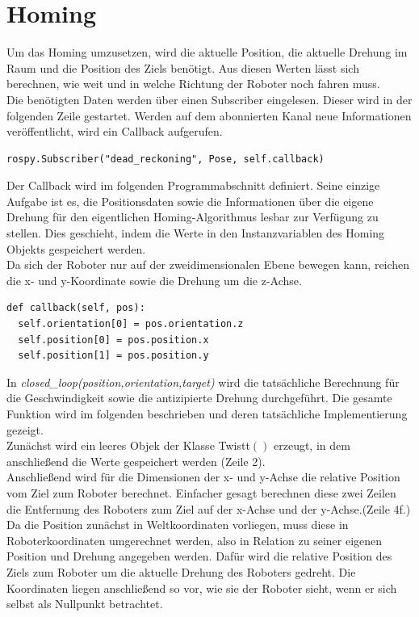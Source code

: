 \documentclass[12pt, a4paper]{report}
\begin{document}
\section{Homing}
Um das Homing umzusetzen, wird die aktuelle Position, die aktuelle Drehung im Raum und die Position des Ziels benötigt. Aus diesen Werten lässt sich berechnen, wie weit und in welche Richtung der Roboter noch fahren muss.\\
Die benötigten Daten werden über einen Subscriber eingelesen. Dieser wird in der folgenden Zeile gestartet. Werden auf dem abonnierten Kanal neue Informationen veröffentlicht, wird ein Callback aufgerufen. 
\begin{lstlisting}
rospy.Subscriber("dead_reckoning", Pose, self.callback)
\end{lstlisting}
Der Callback wird im folgenden Programmabschnitt definiert. Seine einzige Aufgabe ist es, die Positionsdaten sowie die Informationen über die eigene Drehung für den eigentlichen Homing-Algorithmus lesbar zur Verfügung zu stellen. Dies geschieht, indem die Werte in den Instanzvariablen des Homing Objekts gespeichert werden.\\
Da sich der Roboter nur auf der zweidimensionalen Ebene bewegen kann, reichen die x- und y-Koordinate sowie die Drehung um die z-Achse.
\begin{lstlisting}
def callback(self, pos):
  self.orientation[0] = pos.orientation.z
  self.position[0] = pos.position.x
  self.position[1] = pos.position.y
\end{lstlisting}
In \textit{closed\_loop(position,orientation,target)} wird die tatsächliche Berechnung für die Geschwindigkeit sowie die antizipierte Drehung durchgeführt. Die gesamte Funktion wird im folgenden beschrieben und deren tatsächliche Implementierung gezeigt.\\
Zunächst wird ein leeres Objek der Klasse Twistt$()$ erzeugt, in dem anschließend die Werte gespeichert werden (Zeile 2).\\
Anschließend wird für die Dimensionen der x- und y-Achse die relative Position vom Ziel zum Roboter berechnet. Einfacher gesagt berechnen diese zwei Zeilen die Entfernung des Roboters zum Ziel auf der x-Achse und der y-Achse.(Zeile 4f.)\\
Da die Position zunächst in Weltkoordinaten vorliegen, muss diese in Roboterkoordinaten umgerechnet werden, also in Relation zu seiner eigenen Position und Drehung angegeben werden. Dafür wird die relative Position des Ziels zum Roboter um die aktuelle Drehung des Roboters gedreht. Die Koordinaten liegen anschließend so vor, wie sie der Roboter sieht, wenn er sich selbst als Nullpunkt betrachtet.\\
\end{document}
